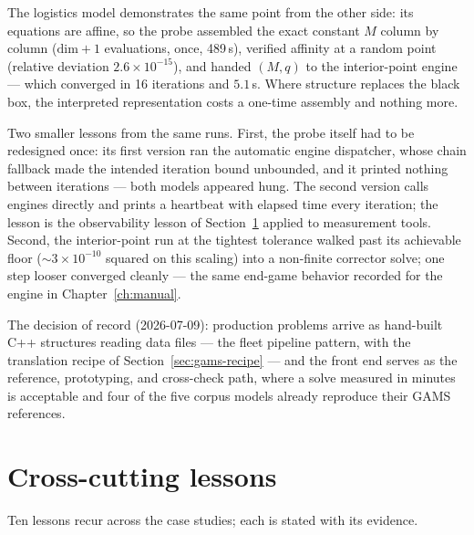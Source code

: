 The logistics model demonstrates the same point from the other side:
its equations are affine, so the probe assembled the exact constant $M$
column by column ($\mathrm{dim}+1$ evaluations, once, 489\,s), verified
affinity at a random point (relative deviation $2.6\times 10^{-15}$), and
handed $(M, q)$ to the interior-point engine --- which converged in 16
iterations and $5.1$\,s. Where structure replaces the black box, the
interpreted representation costs a one-time assembly and nothing more.

Two smaller lessons from the same runs. First, the probe itself had to be
redesigned once: its first version ran the automatic engine dispatcher,
whose chain fallback made the intended iteration bound unbounded, and it
printed nothing between iterations --- both models appeared hung. The
second version calls engines directly and prints a heartbeat with elapsed
time every iteration; the lesson is the observability lesson of
Section~\ref{sec:t-lessons} applied to measurement tools. Second, the
interior-point run at the tightest tolerance walked past its achievable
floor ($\sim 3\times 10^{-10}$ squared on this scaling) into a non-finite
corrector solve; one step looser converged cleanly --- the same end-game
behavior recorded for the engine in Chapter~\ref{ch:manual}.

The decision of record (2026-07-09): production problems arrive as
hand-built C++ structures reading data files --- the fleet pipeline
pattern, with the translation recipe of Section~\ref{sec:gams-recipe} ---
and the front end serves as the reference, prototyping, and cross-check
path, where a solve measured in minutes is acceptable and four of the
five corpus models already reproduce their GAMS references.

\section{Cross-cutting lessons}
\label{sec:t-lessons}

Ten lessons recur across the case studies; each is stated with its
evidence.

